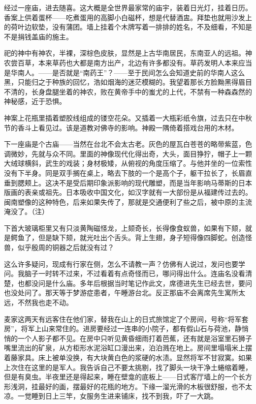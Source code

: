\par 经过一座庙，进去随喜。这大概是全世界最家常的庙宇，装着日光灯，挂着日历。香案上供着蛋杯——吃煮蛋用的高脚小白磁杯，想是代替酒盅。拜垫也就用沙发上的荷叶边软垫，没有蒲团。墙上挂着个木牌写着一排排的姓名，不及细看，不知是不是捐钱盖庙的施主。
\par 祀的神中有神农，半裸，深棕色皮肤，显然是上古华南居民，东南亚人的远祖。神农尝百草，本来草药也大都是南方出产，北边有许多都没有。草药发明人本来应当是华南人。——是否就是“南药王”？——至于民间怎么会知道史前的华南人这么黑，只能归之于种族的回忆，浩如烟海的迷茫模糊的。我望着那长方脸黝黑得眉目不清的，长身盘腿坐着的神农，败在黄帝手中的蚩尤的上代，不禁有一种森森然的神秘感，近于恐惧。
\par 神案上花瓶里插着塑胶线组成的镂空花朵。又插着一大瓶彩纸令旗，过去只在中秋节的香斗上看见过。该是道教对佛寺的影响。神殿一隅倚着搭戏台用的木材。
\par 下一座庙是个古庙——当然在台北不会太古老。灰色的屋瓦白苍苍的略带紫蓝，色调微妙，先就与众不同。里面的神像现代化得出奇，大头，面目狰狞，帽子上一颗大绒球横斜，武生的戏装；身材极矮，从俯视的角度压缩了。与他并坐的一位索性没有下半身。同是双手搁在桌上，略去下肢的一个是高个子，躯干拉长了，长眉直垂到腮颊上。这决不是受后期印象派影响的现代雕塑，而是当年影响马蒂斯的日本版画的表亲或祖先。日本吸收中国文化，如汉字就有一大部份是从福建传过去的。闽南塑像的这种特色，后来如果失传了，那就是交通便利了些之后，被中原的主流淹没了。（注）
\par 下首大玻璃柜里又有只淡黄陶磁怪龙，上颏奇长，长得像食蚁兽，如果有下颏，就是鳄鱼了，但是缺下颏，就光吐出个舌头。背上生翅，身子短得像四脚蛇。创造怪兽，似乎殷周的铜器之后就没有过？
\par 这么许多疑问，现成有行家在侧，怎么不请教一声？仿佛有人说过，发问也要学问。我脑子一时转不过来，不过看着有点奇怪而已，哪问得出什么。连庙名没看清楚，也都没问是什么庙。多年后根据当时笔记作此文，席德进先生已经去世，要问也没处问了。那天等于梦游症患者，午睡游台北。反正那庙不会离席先生寓所太远，不然我也走不动。
\par 麦家这两天有远客住在他们家，替我在山上的日式旅馆定了个房间，号称“将军套房”，将军上山来常住的。进房要经过一连串的小院子，都有假山石与荷池，静悄悄的一个人影子都不见。在房中只听见黄昏细雨打着芭蕉，还有就是浴室里石狮子嘴里流出的矿泉，从方柜形水泥浴缸口漫出来，泊泊溅在地上。房间里塌塌米上摆着藤家具。床上被单没换，有大块黄白色的浆硬的水渍。显然将军不甘寂寞。如果上次住在这里的是军人。我告诉自己不要太挑剔，找了脚头一块干净土蜷缩着睡，但是有臭虫。半夜里还是得起来，睡在壁龛的底板上——日式客厅墙上的一个长方形浅洞，挂最好的画，摆最好的花瓶的地方。下缘一溜光滑的木板很舒服，也不太凉。一觉睡到日上三竿，女服务生进来铺床，找不到我，吓了一大跳。
